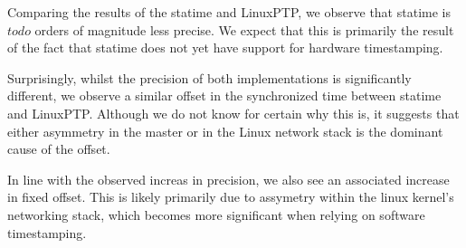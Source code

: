 \documentclass{article}
\begin{document}
Comparing the results of the statime and LinuxPTP, we observe that statime is $todo$ orders of magnitude less precise. We expect that this is primarily the result of the fact that statime does not yet have support for hardware timestamping.

Surprisingly, whilst the precision of both implementations is significantly different, we observe a similar offset in the synchronized time between statime and LinuxPTP. Although we do not know for certain why this is, it suggests that either asymmetry in the master or in the Linux network stack is the dominant cause of the offset.

In line with the observed increas in precision, we also see an associated increase in fixed offset. This is likely primarily due to assymetry within the linux kernel's networking stack, which becomes more significant when relying on software timestamping.
\end{document}
